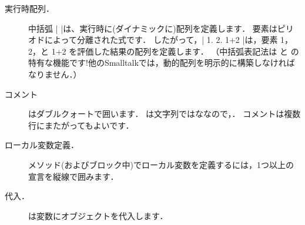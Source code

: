 \documentclass[a4paper,10pt,twoside]{book}
\begin{document}
\begin{description}
\item[実行時配列．] 中括弧 \ct|{ }|は、実行時に(ダイナミックに)配列を定義します．
		要素はピリオドによって分離された式です．
		したがって，\ct|{ 1. 2. 1+2 }|は，要素 1， 2，と 1+2 を評価した結果の配列を定義します．
		（中括弧表記法は \pharo と \squeak の特有な機能です!他のSmalltalkでは，動的配列を明示的に構築しなければなりません．）

\item[コメント]はダブルクォートで囲います．
		 は文字列ではななので，．
		コメントは複数行にまたがってもよいです．
		
\item[ローカル変数定義．] メソッド(およびブロック中)でローカル変数を定義するには，1つ以上の宣言を縦線\ct{| |}で囲みます．

\item[代入．] \ct{:=} は変数にオブジェクトを代入します．


\end{description}
\end{document}

